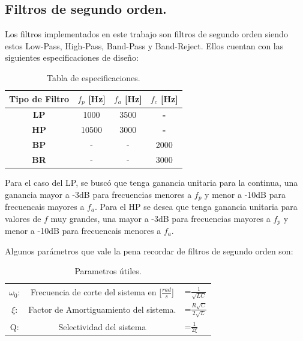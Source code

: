  \flushleft
\subsection{Filtros de segundo orden.}

Los filtros implementados en este trabajo son filtros de segundo orden siendo estos Low-Pass, High-Pass, Band-Pass y Band-Reject. Ellos cuentan con las siguientes especificaciones de diseño:
\begin{table}[H]
\begin{center}
\begin{tabular}{|c|c|c|c|}
\hline
\textbf{Tipo de Filtro} & \textbf{$f_p$ [Hz]} & \textbf{$f_a$ [Hz]} & \textbf{$f_c$ [Hz]} \\ \hline
\textbf{LP}             & 1000                & 3500                & \textbf{-}          \\ \hline
\textbf{HP}             & 10500               & 3000                & \textbf{-}          \\ \hline
\textbf{BP}             & -                   & -                   & 2000                \\ \hline
\textbf{BR}             & -                   & -                   & 3000                \\ \hline
\end{tabular}
\caption{Tabla de especificaciones.}
\label{tab:specs}
\end{center}
\end{table}

Para el caso del LP, se buscó que tenga ganancia unitaria para la continua, una ganancia mayor a -3dB para frecuencias menores a $f_p$ y menor a -10dB para frecuencais mayores a $f_a$. Para el HP se desea que tenga ganancia unitaria para valores de $f$ muy grandes, una mayor a -3dB para frecuencias mayores a $f_p$ y menor a -10dB para frecuencais menores a $f_a$.


Algunos parámetros que vale la pena recordar de filtros de segundo orden son:
\begin{table}[H]
\begin{center}
\begin{tabular}{c|cl}
$\omega_0$: & Frecuencia de corte del sistema en [$\frac{rad}{s}$] & =$\frac{1}{\sqrt{LC}}$         \\
$\xi$:      & Factor de Amortiguamiento del sistema.               & =$\frac{R\sqrt{C}}{2\sqrt{L}}$ \\
Q:          & Selectividad del sistema                             & =$\frac{1}{2\xi}$             
\end{tabular}
\end{center}
\caption{Parametros útiles.}
\label{tab:utils}
\end{table}


